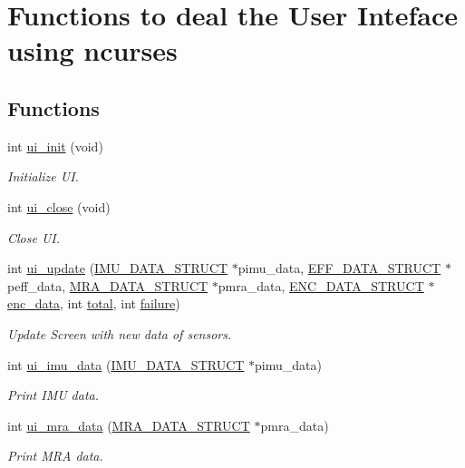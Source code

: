 \hypertarget{group__ui}{\section{Functions to deal the User Inteface using ncurses}
\label{group__ui}
}
\subsection*{Functions}
\begin{DoxyCompactItemize}
\item 
int \hyperlink{group__ui_gab7bfb453918dcc296ff0cea3c79453d0}{ui\-\_\-init} (void)
\begin{DoxyCompactList}\small\item\em Initialize U\-I. \end{DoxyCompactList}\item 
int \hyperlink{group__ui_ga65d8b92b634da17c344458cd57e61f3e}{ui\-\_\-close} (void)
\begin{DoxyCompactList}\small\item\em Close U\-I. \end{DoxyCompactList}\item 
int \hyperlink{group__ui_ga42e4dac2d138061a74c572358c8ebf49}{ui\-\_\-update} (\hyperlink{structIMU__DATA__STRUCT}{I\-M\-U\-\_\-\-D\-A\-T\-A\-\_\-\-S\-T\-R\-U\-C\-T} $\ast$pimu\-\_\-data, \hyperlink{structEFF__DATA__STRUCT}{E\-F\-F\-\_\-\-D\-A\-T\-A\-\_\-\-S\-T\-R\-U\-C\-T} $\ast$peff\-\_\-data, \hyperlink{structMRA__DATA__STRUCT}{M\-R\-A\-\_\-\-D\-A\-T\-A\-\_\-\-S\-T\-R\-U\-C\-T} $\ast$pmra\-\_\-data, \hyperlink{structENC__DATA__STRUCT}{E\-N\-C\-\_\-\-D\-A\-T\-A\-\_\-\-S\-T\-R\-U\-C\-T} $\ast$\hyperlink{main2_8c_aaa441e18ae805c4f3efb0b5231d1cfe7}{enc\-\_\-data}, int \hyperlink{threads__linux_8c_ac7af894858cf396a219d632f40afdc8d}{total}, int \hyperlink{threads__linux_8c_a4f35e5ea2395561d0bd3b2f45612dc2c}{failure})
\begin{DoxyCompactList}\small\item\em Update Screen with new data of sensors. \end{DoxyCompactList}\item 
int \hyperlink{group__ui_ga7d5a9d9a75693709de408781d001a6a6}{ui\-\_\-imu\-\_\-data} (\hyperlink{structIMU__DATA__STRUCT}{I\-M\-U\-\_\-\-D\-A\-T\-A\-\_\-\-S\-T\-R\-U\-C\-T} $\ast$pimu\-\_\-data)
\begin{DoxyCompactList}\small\item\em Print I\-M\-U data. \end{DoxyCompactList}\item 
int \hyperlink{group__ui_gaefec243c5df45db0350c1abbccf20e3b}{ui\-\_\-mra\-\_\-data} (\hyperlink{structMRA__DATA__STRUCT}{M\-R\-A\-\_\-\-D\-A\-T\-A\-\_\-\-S\-T\-R\-U\-C\-T} $\ast$pmra\-\_\-data)
\begin{DoxyCompactList}\small\item\em Print M\-R\-A data. \end{DoxyCompactList}\end{DoxyCompactItemize}


